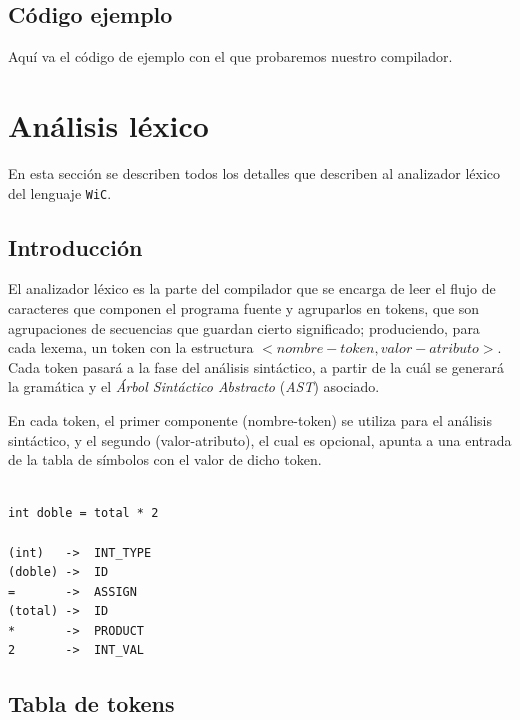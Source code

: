 \documentclass[11pt, english]{article}
\begin{document}
\subsection{Código ejemplo}\label{example-code}
Aquí va el código de ejemplo con el que probaremos nuestro compilador.

\section{Análisis léxico}\label{Definicion-lenguaje}
En esta sección se describen todos los detalles que describen al analizador léxico del lenguaje \texttt{WiC}.

\subsection{Introducción}\label{Introdución}
El analizador léxico es la parte del compilador que se encarga de leer el flujo de caracteres que componen el programa fuente y agruparlos en tokens, que son agrupaciones de secuencias que guardan cierto significado; produciendo, para cada lexema, un token con la estructura $<nombre-token, valor-atributo>$. Cada token pasará a la fase del análisis sintáctico, a partir de la cuál se generará la gramática y el \textit{Árbol Sintáctico Abstracto} (\textit{AST}) asociado.


En cada token, el primer componente (nombre-token) se utiliza para el análisis sintáctico, y el segundo (valor-atributo), el cual es opcional, apunta a una entrada de la tabla de símbolos con el valor de dicho token.

\begin{lstlisting}[caption=Ejemplo de conversión de un conjunto de caracteres de un programa WiC en tokens]

int doble = total * 2

(int) 	-> 	INT_TYPE
(doble) -> 	ID
= 		-> 	ASSIGN
(total) -> 	ID
* 		-> 	PRODUCT
2		->	INT_VAL

\end{lstlisting}

\subsection{Tabla de tokens}\label{Tabla de tokens}
\end{document}
